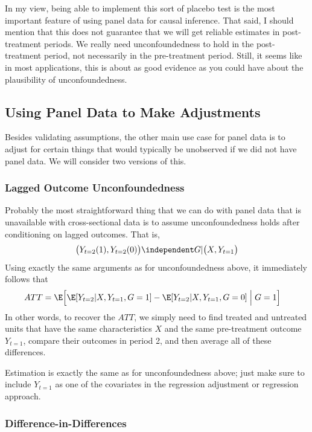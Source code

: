 \documentclass[
  letterpaper,
  DIV=11,
  numbers=noendperiod]{scrreprt}
\begin{document}
In my view, being able to implement this sort of placebo test is the
most important feature of using panel data for causal inference. That
said, I should mention that this does not guarantee that we will get
reliable estimates in post-treatment periods. We really need
unconfoundedness to hold in the post-treatment period, not necessarily
in the pre-treatment period. Still, it seems like in most applications,
this is about as good evidence as you could have about the plausibility
of unconfoundedness.

\subsection{Using Panel Data to Make
Adjustments}\label{using-panel-data-to-make-adjustments}

Besides validating assumptions, the other main use case for panel data
is to adjust for certain things that would typically be unobserved if we
did not have panel data. We will consider two versions of this.

\subsubsection{Lagged Outcome
Unconfoundedness}\label{lagged-outcome-unconfoundedness}

Probably the most straightforward thing that we can do with panel data
that is unavailable with cross-sectional data is to assume
unconfoundedness holds after conditioning on lagged outcomes. That is,
\begin{align*}
  \big(Y_{t=2}(1), Y_{t=2}(0)\big) \independent G | \big(X, Y_{t=1}\big)
\end{align*} Using exactly the same arguments as for unconfoundedness
above, it immediately follows that \begin{align*}
  ATT &= \E\Big[ \E[Y_{t=2} | X, Y_{t=1}, G=1] - \E[Y_{t=2} | X, Y_{t=1}, G=0] \Bigm| G=1 \Big]
\end{align*} In other words, to recover the \(ATT\), we simply need to
find treated and untreated units that have the same characteristics
\(X\) and the same pre-treatment outcome \(Y_{t=1}\), compare their
outcomes in period 2, and then average all of these differences.

Estimation is exactly the same as for unconfoundedness above; just make
sure to include \(Y_{t=1}\) as one of the covariates in the regression
adjustment or regression approach.

\subsubsection{Difference-in-Differences}\label{difference-in-differences}
\end{document}
